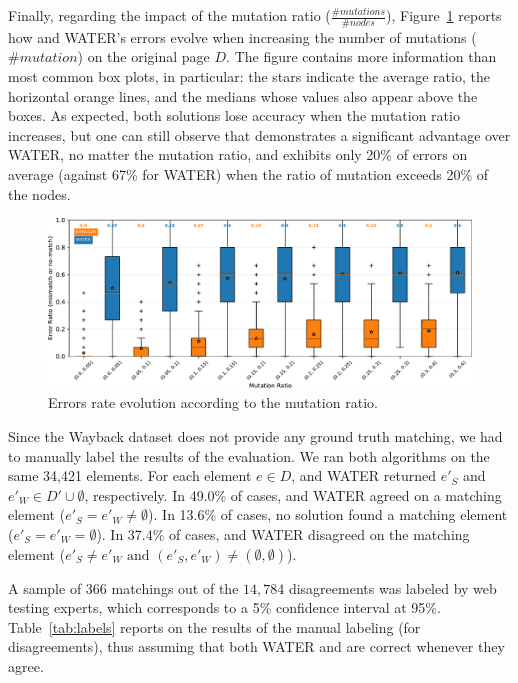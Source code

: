 Finally, regarding the impact of the mutation ratio ($\frac{\#mutations}{\#nodes}$), Figure~\ref{fig:erroRatioMutation} reports how \erratum and WATER's errors evolve when increasing the number of mutations ($\#mutation$) on the original page $D$.
The figure contains more information than most common box plots, in particular: the stars indicate the average ratio, the horizontal orange lines, and the medians whose values also appear above the boxes.
As expected, both solutions lose accuracy when the mutation ratio increases, but one can still observe that \erratum demonstrates a significant advantage over WATER, no matter the mutation ratio, and exhibits only 20\% of errors on average (against 67\% for WATER) when the ratio of mutation exceeds 20\% of the nodes.

\begin{figure}[]
  \centering
  \includegraphics[width=1\linewidth]{erratum/errorPerMutationRatio}
  \caption{Errors rate evolution according to the mutation ratio.}
  \label{fig:erroRatioMutation}
\end{figure}


\vspace{6pt}
Since the {\sc Wayback} dataset does not provide any ground truth matching, we had to manually label the results of the evaluation.
We ran both algorithms on the same 34,421 elements.
For each element $e \in D$, \erratum and WATER returned $e'_{S}$ and $e'_{W} \in D' \cup \emptyset$, respectively.
In 49.0\% of cases, \erratum and WATER agreed on a matching element ($e'_{S} = e'_{W} \ne \emptyset$).
In 13.6\% of cases, no solution found a matching element ($e'_{S} = e'_{W}= \emptyset$).
In 37.4\% of cases, \erratum and WATER disagreed on the matching element ($e'_{S} \ne e'_{W} \text{ and } (e'_{S}, e'_{W}) \ne (\emptyset, \emptyset)$).

A sample of $366$ matchings out of the $14,784$ disagreements was labeled by web testing experts, which corresponds to a 5\% confidence interval at 95\%.
Table~\ref{tab:labels} reports on the results of the manual labeling (for disagreements), thus assuming that both WATER and \erratum are correct whenever they agree.

